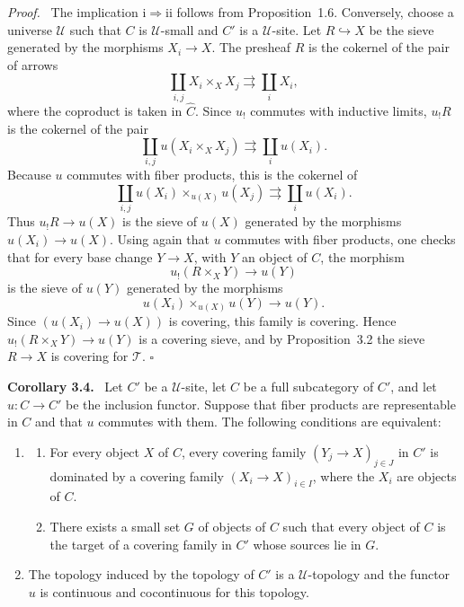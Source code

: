 \documentclass[11pt]{article}
\newcommand{\U}{\mathcal{U}}
\newcommand{\T}{\mathcal{T}}
\newcommand{\qedtext}{\hfill\(\square\)}
\newenvironment{statement}[1]{\par\medskip\noindent\textbf{#1.}\ }{\par\medskip}
\newenvironment{prooftext}{\par\noindent\emph{Proof.}\ }{\par\medskip}
\begin{document}
\begin{prooftext}
The implication \(\mathrm{i}\Rightarrow\mathrm{ii}\) follows from Proposition~1.6. Conversely, choose a universe \(\U\) such that \(C\) is \(\U\)-small and \(C'\) is a \(\U\)-site. Let \(R\hookrightarrow X\) be the sieve generated by the morphisms \(X_i\to X\). The presheaf \(R\) is the cokernel of the pair of arrows
\[
\coprod_{i,j}X_i\times_XX_j\rightrightarrows\coprod_iX_i,
\]
where the coproduct is taken in \(\widehat C\). Since \(u_!\) commutes with inductive limits, \(u_!R\) is the cokernel of the pair
\[
\coprod_{i,j}u(X_i\times_XX_j)\rightrightarrows\coprod_i u(X_i).
\]
Because \(u\) commutes with fiber products, this is the cokernel of
\[
\coprod_{i,j}u(X_i)\times_{u(X)}u(X_j)\rightrightarrows\coprod_i u(X_i).
\]
Thus \(u_!R\to u(X)\) is the sieve of \(u(X)\) generated by the morphisms \(u(X_i)\to u(X)\). Using again that \(u\) commutes with fiber products, one checks that for every base change \(Y\to X\), with \(Y\) an object of \(C\), the morphism
\[
u_!(R\times_XY)\to u(Y)
\]
is the sieve of \(u(Y)\) generated by the morphisms
\[
u(X_i)\times_{u(X)}u(Y)\to u(Y).
\]
Since \((u(X_i)\to u(X))\) is covering, this family is covering. Hence \(u_!(R\times_XY)\to u(Y)\) is a covering sieve, and by Proposition~3.2 the sieve \(R\to X\) is covering for \(\T\). \qedtext
\end{prooftext}

\begin{statement}{Corollary 3.4}
Let \(C'\) be a \(\U\)-site, let \(C\) be a full subcategory of \(C'\), and let \(u:C\to C'\) be the inclusion functor. Suppose that fiber products are representable in \(C\) and that \(u\) commutes with them. The following conditions are equivalent:
\begin{enumerate}[label=\roman*)]
\item
\begin{enumerate}[label=\alph*)]
\item For every object \(X\) of \(C\), every covering family \((Y_j\to X)_{j\in J}\) in \(C'\) is dominated by a covering family \((X_i\to X)_{i\in I}\), where the \(X_i\) are objects of \(C\).
\item There exists a small set \(G\) of objects of \(C\) such that every object of \(C\) is the target of a covering family in \(C'\) whose sources lie in \(G\).
\end{enumerate}
\item The topology induced by the topology of \(C'\) is a \(\U\)-topology and the functor \(u\) is continuous and cocontinuous for this topology.
\end{enumerate}
\end{statement}
\end{document}
